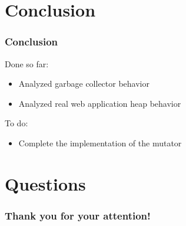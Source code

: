\documentclass[xcolor=x11names,compress]{beamer}
\begin{document}
	\section{Conclusion}
	\begin{frame}
		\frametitle{Conclusion}
		Done so far:
		\begin{itemize}
			\item Analyzed garbage collector behavior
			\item Analyzed real web application heap behavior
		\end{itemize}
		To do:
		\begin{itemize}
			\item Complete the implementation of the mutator
		\end{itemize}
	\end{frame}
	
	\section{Questions}
	\begin{frame}
		\frametitle{Thank you for your attention!}
	\end{frame}
	
\end{document}

